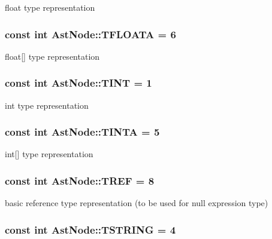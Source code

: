 \label{classAstNode_abf470f775bd7a7bfc2c0610716054339}
float type representation \hypertarget{classAstNode_a9d01a6ac8a4a7a5b2d4a3ec8a7e93fa7}{
\subsubsection[{TFLOATA}]{\setlength{\rightskip}{0pt plus 5cm}const int {\bf AstNode::TFLOATA} = 6}}
\label{classAstNode_a9d01a6ac8a4a7a5b2d4a3ec8a7e93fa7}
float\mbox{[}\mbox{]} type representation \hypertarget{classAstNode_a8568313f5d280773a446280c94d382f8}{
\subsubsection[{TINT}]{\setlength{\rightskip}{0pt plus 5cm}const int {\bf AstNode::TINT} = 1}}
\label{classAstNode_a8568313f5d280773a446280c94d382f8}
int type representation \hypertarget{classAstNode_a7233043e1a9d95c3120a62ac66c89608}{
\subsubsection[{TINTA}]{\setlength{\rightskip}{0pt plus 5cm}const int {\bf AstNode::TINTA} = 5}}
\label{classAstNode_a7233043e1a9d95c3120a62ac66c89608}
int\mbox{[}\mbox{]} type representation \hypertarget{classAstNode_ad84a595b7727d93d325664d5bf89c766}{
\subsubsection[{TREF}]{\setlength{\rightskip}{0pt plus 5cm}const int {\bf AstNode::TREF} = 8}}
\label{classAstNode_ad84a595b7727d93d325664d5bf89c766}
basic reference type representation (to be used for null expression type) \hypertarget{classAstNode_a2245a2aec841592ecddf8f9497306a4b}{
\subsubsection[{TSTRING}]{\setlength{\rightskip}{0pt plus 5cm}const int {\bf AstNode::TSTRING} = 4}}
